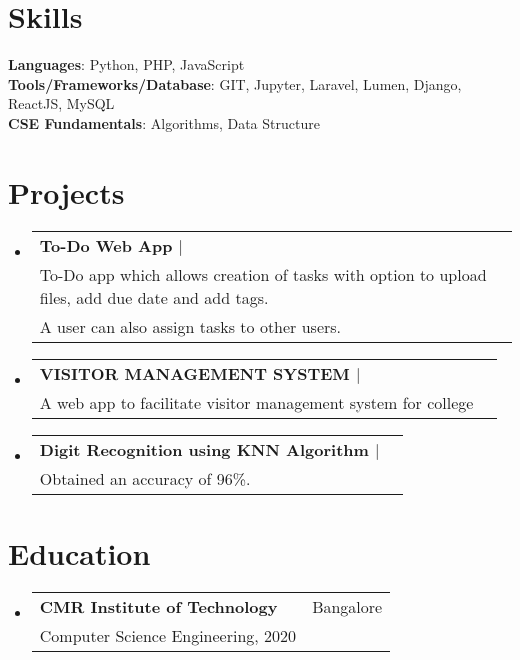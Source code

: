 \documentclass[A4,11pt]{article}
\makeatletter
\newcommand{\CVSubheading}[4]{
  \vspace{-2pt}\item
    \begin{tabular*}{0.97\textwidth}[t]{l@{\extracolsep{\fill}}r}
      \textbf{#1} & #2 \\
      \small#3 & \small #4 \\
    \end{tabular*}\vspace{-7pt}
}
\newcommand{\CVSubHeadingListStart}{\begin{itemize}[leftmargin=0.5cm, label={}]}
\newcommand{\CVSubHeadingListEnd}{\end{itemize}}
\makeatother
\begin{document}
\section{Skills}
 \begin{itemize}[leftmargin=0.5cm, label={}]
    \small{\item{
     \textbf{Languages}{: Python, PHP, JavaScript} \\
     \textbf{Tools/Frameworks/Database}{: GIT, Jupyter, Laravel, Lumen, Django, ReactJS, MySQL} \\
     \textbf{CSE Fundamentals}{: Algorithms, Data Structure} \\
    }}
 \end{itemize}
   
\begin{comment}
Ideally the title of the work should speak for what it is. However if you feel
like you should explain more about why the project is applicable to this job,
use item list as is shown in the work experience section.
\end{comment}

\section{Projects}
  \CVSubHeadingListStart
    \CVSubheading
      {{To-Do Web App} $|$ \emph{\small\color{gray}{Laravel, HTML,CSS,JS}}}{}
      {To-Do app which allows creation of tasks with option to upload files, add due date and add tags.\\ A user can also assign tasks to other users. }{}
    \CVSubheading
      {{VISITOR MANAGEMENT SYSTEM} $|$ \emph{\small\color{gray}{HTML/CSS, MySQL, PHP, Bootstrap}}}{}
      {A web app to facilitate visitor management system for college}{}
    \CVSubheading
      {{Digit Recognition using KNN Algorithm} $|$ \emph{\small\color{gray}{Python, Jupyter Notebook}}}{}
      {Obtained an accuracy of 96\%.}{}
    
  \CVSubHeadingListEnd


\section{Education}
  \CVSubHeadingListStart
    \CVSubheading
      {{CMR Institute of Technology  {}}}{Bangalore}
      {Computer Science Engineering, 2020}{}
  
  \CVSubHeadingListEnd
\end{document}
